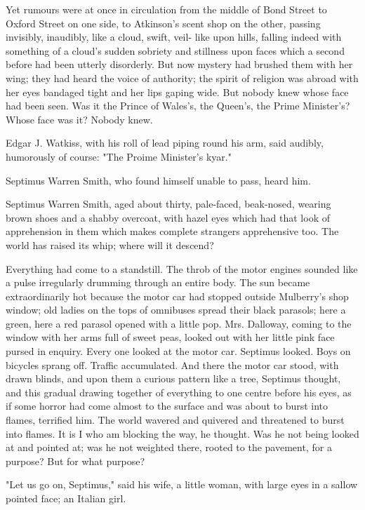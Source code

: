 \documentclass[lang=cn,10pt]{elegantbook}
\begin{document}
Yet rumours were at once in circulation from the middle of Bond
Street to Oxford Street on one side, to Atkinson's scent shop on
the other, passing invisibly, inaudibly, like a cloud, swift, veil-
like upon hills, falling indeed with something of a cloud's sudden
sobriety and stillness upon faces which a second before had been
utterly disorderly.  But now mystery had brushed them with her
wing; they had heard the voice of authority; the spirit of religion
was abroad with her eyes bandaged tight and her lips gaping wide.
But nobody knew whose face had been seen.  Was it the Prince of
Wales's, the Queen's, the Prime Minister's?  Whose face was it?
Nobody knew.

Edgar J. Watkiss, with his roll of lead piping round his arm, said
audibly, humorously of course:  "The Proime Minister's kyar."

Septimus Warren Smith, who found himself unable to pass, heard him.

Septimus Warren Smith, aged about thirty, pale-faced, beak-nosed,
wearing brown shoes and a shabby overcoat, with hazel eyes which
had that look of apprehension in them which makes complete
strangers apprehensive too.  The world has raised its whip; where
will it descend?

Everything had come to a standstill.  The throb of the motor
engines sounded like a pulse irregularly drumming through an entire
body.  The sun became extraordinarily hot because the motor car had
stopped outside Mulberry's shop window; old ladies on the tops of
omnibuses spread their black parasols; here a green, here a red
parasol opened with a little pop.  Mrs. Dalloway, coming to the
window with her arms full of sweet peas, looked out with her little
pink face pursed in enquiry.  Every one looked at the motor car.
Septimus looked.  Boys on bicycles sprang off.  Traffic
accumulated.  And there the motor car stood, with drawn blinds, and
upon them a curious pattern like a tree, Septimus thought, and this
gradual drawing together of everything to one centre before his
eyes, as if some horror had come almost to the surface and was
about to burst into flames, terrified him.  The world wavered and
quivered and threatened to burst into flames.  It is I who am
blocking the way, he thought.  Was he not being looked at and
pointed at; was he not weighted there, rooted to the pavement, for
a purpose?  But for what purpose?

"Let us go on, Septimus," said his wife, a little woman, with large
eyes in a sallow pointed face; an Italian girl.
\end{document}
